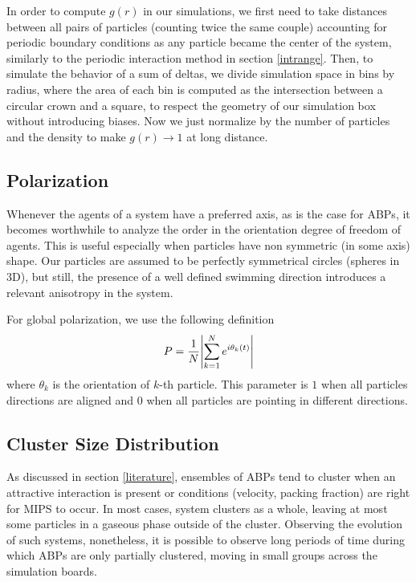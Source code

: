 \documentclass[../../master_thesis_np.tex]{subfiles}
\begin{document}
		In order to compute $g(r)$ in our simulations, we first need to take distances between all pairs of particles (counting twice the same couple) accounting for periodic boundary conditions as any particle became the center of the system, similarly to the periodic interaction method in section \ref{intrange}. 
		Then, to simulate the behavior of a sum of deltas, we divide simulation space in bins by radius, where the area of each bin is computed as the intersection between a circular crown and a square, to respect the geometry of our simulation box without introducing biases. 
		Now we just normalize by the number of particles and the density to make $g(r) \to 1$ at long distance.
		
		\subsection{Polarization}
		Whenever the agents of a system have a preferred axis, as is the case for ABPs, it becomes worthwhile to analyze the order in the orientation degree of freedom of agents. 
		This is useful especially when particles have non symmetric (in some axis) shape. 
		Our particles are assumed to be perfectly symmetrical circles (spheres in 3D), but still, the presence of a well defined swimming direction introduces a relevant anisotropy in the system. 
		
		For global polarization, we use the following definition
		\begin{equation}
			P = \frac{1}{N} \abs{\sum_{k=1}^{N} e^{i \theta_k(t)}} 
		\end{equation}
		where $\theta_k$ is the orientation of $k$-th particle. 
		This parameter is $1$ when all particles directions are aligned and $0$ when all particles are pointing in different directions. 
		
		\subsection{Cluster Size Distribution}
		As discussed in section \ref{literature}, ensembles of ABPs tend to cluster when an attractive interaction is present or conditions (velocity, packing fraction) are right for MIPS to occur. 
		In most cases, system clusters as a whole, leaving at most some particles in a gaseous phase outside of the cluster. 
		Observing the evolution of such systems, nonetheless, it is possible to observe long periods of time during which ABPs are only partially clustered, moving in small groups across the simulation boards. 
		
\end{document}
